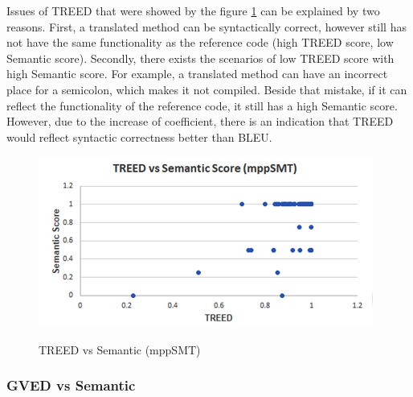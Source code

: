 
Issues of TREED that were showed by the figure \ref{fig:TREEDmppSMT} can be explained by two reasons. First, a translated method can be syntactically correct, however still has not have the same functionality as the reference
code (high TREED score, low Semantic score). Secondly, there
exists the scenarios of low TREED score with high Semantic score. For
example, a translated method can have an incorrect place for a
semicolon, which makes it not compiled. Beside that mistake, if it can
reflect the functionality of the reference code, it still has a high
Semantic score. However, due to the increase of coefficient, there is
an indication that TREED would reflect syntactic correctness better
than BLEU.


%
\begin{figure}
\caption{TREED vs Semantic (mppSMT)}
\centering
\includegraphics{img/treed_mppSMT.png}
\label{fig:TREEDmppSMT}
\end{figure}

\subsubsection{\textbf{GVED vs Semantic}}

